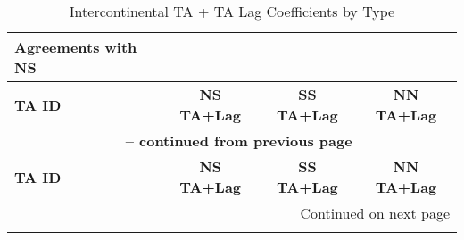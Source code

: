 \begin{center}
\small
\begin{longtable}{lccc}
    \caption{Intercontinental TA + TA Lag Coefficients by Type} \label{tab:intercontinental_pta} \\

    \hline
    \textbf{Agreements with NS} &  &  &  \\
    \hline
    \textbf{TA ID} & \textbf{NS TA+Lag} & \textbf{SS TA+Lag} & \textbf{NN TA+Lag} \\
    \hline
    \endfirsthead
    
    \multicolumn{4}{c}{{\bfseries \tablename\ \thetable{} -- continued from previous page}} \\
    \hline
    \textbf{TA ID} & \textbf{NS TA+Lag} & \textbf{SS TA+Lag} & \textbf{NN TA+Lag} \\
    \hline
    \endhead
    
    \hline \multicolumn{4}{r}{{Continued on next page}} \\ \hline
    \endfoot
    
    \hline
    \endlastfoot
    

\end{longtable}
\end{center}
